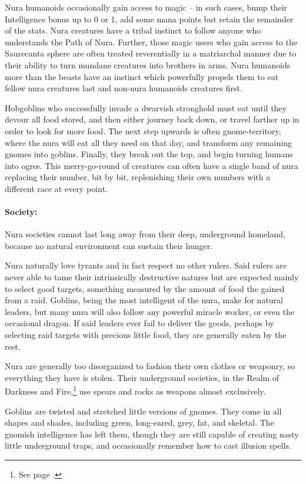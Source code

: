 \begin{multicols}{2}
Nura humanoids occasionally gain access to magic -- in such cases, bump their Intelligence bonus up to 0 or 1, add some mana points but retain the remainder of the stats.
Nura creatures have a tribal instinct to follow anyone who understands the Path of Nura.
Further, those magic users who gain access to the Saurecanta sphere are often treated reverentially in a matriarchal manner due to their ability to turn mundane creatures into brothers in arms.
Nura humanoids more than the beasts have an instinct which powerfully propels them to eat fellow nura creatures last and non-nura humanoids creatures first.

Hobgoblins who successfully invade a dwarvish stronghold must eat until they devour all food stored, and then either journey back down, or travel farther up in order to look for more food.
The next step upwards is often gnome-territory, where the nura will eat all they need on that day, and transform any remaining gnomes into goblins.
Finally, they break out the top, and begin turning humans into ogres.
This merry-go-round of creatures can often have a single band of nura replacing their number, bit by bit, replenishing their own numbers with a different race at every point.

\paragraph{Society:}
Nura societies cannot last long away from their deep, underground homeland, because no natural environment can sustain their hunger.

Nura naturally love tyrants and in fact respect no other rulers.
Said rulers are never able to tame their intrinsically destructive natures but are expected mainly to select good targets, something measured by the amount of food the gained from a raid.
Goblins, being the most intelligent of the nura, make for natural leaders, but many nura will also follow any powerful miracle worker, or even the occasional dragon.
If said leaders ever fail to deliver the goods, perhaps by selecting raid targets with precious little food, they are generally eaten by the rest.

Nura are generally too disorganized to fashion their own clothes or weaponry, so everything they have is stolen.
Their underground societies, in the Realm of Darkness and Fire,\footnote{See page \pageref{darknessandfire}.} use spears and rocks as weapons almost exclusively.
\label{goblin}

Goblins are twisted and stretched little versions of gnomes.
They come in all shapes and shades, including green, long-eared, grey, fat, and skeletal.
The gnomish intelligence has left them, though they are still capable of creating nasty little underground traps, and occasionally remember how to cast illusion spells.


\end{multicols}
